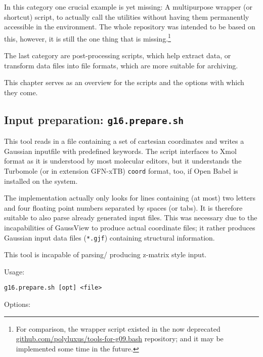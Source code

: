 \documentclass[   %
  final,          %
  a4paper         %
]{article}
\begin{document}
In this category one crucial example is yet missing:
A multipurpose wrapper (or shortcut) script, 
to actually call the utilities without having them permanently accessible 
in the environment.
The whole repository was intended to be based on this, 
however, it is still the one thing that is missing.\footnote{%
  For comparison, the wrapper script existed in the now deprecated
  \href{https://github.com/polyluxus/tools-for-g09.bash}{github.com/polyluxus/tools-for-g09.bash}
  repository; and it may be implemented some time in the future.}

The last category are post-processing scripts, 
which help extract data, or transform data files into file formats,
which are more suitable for archiving.

This chapter serves as an overview for the scripts 
and the options with which they come.

\subsection{Input preparation: \texorpdfstring{{\lstinline`g16.prepare.sh`}}{g16.prepare.sh}}

This tool reads in a file containing a set of cartesian coordinates and
writes a Gaussian inputfile with predefined keywords. 
The script interfaces to Xmol format as it is understood by most molecular editors, 
but it understands the Turbomole (or in extension GFN-xTB) \texttt{coord} format, too,
if Open Babel is installed on the system.

The implementation actually only looks for lines containing (at most) two letters
and four floating point numbers separated by spaces (or tabs).
It is therefore suitable to also parse already generated input files.
This was necessary due to the incapabilities of GaussView to produce
actual coordinate files; it rather produces Gaussian input data files (\texttt{*.gjf}) 
containing structural information.

This tool is incapable of parsing/ producing z-matrix style input.

Usage: 

\lstinline`g16.prepare.sh [opt] <file>`

Options:
\end{document}
